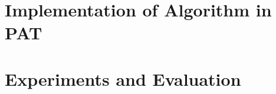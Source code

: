 \documentclass{llncs}
\begin{document}
%
\section{Implementation of Algorithm in PAT}
%

%
\section{Experiments and Evaluation}



%
%
\begin{thebibliography}{}
%


\end{thebibliography}
%
\end{document}
